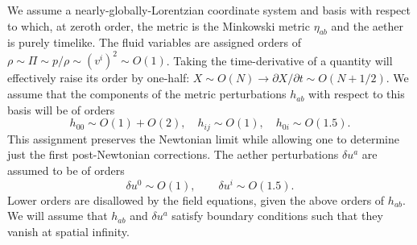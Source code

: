 \documentclass[aps,prd,preprint,amsmath,amssymb]{revtex4}
\def\beq{\begin{equation}}
\def\eeq{\end{equation}}
\begin{document}
We assume a nearly-globally-Lorentzian coordinate system and basis
with respect to which, at zeroth order, the metric is the
Minkowski metric $\eta_{ab}$ and the aether is purely
timelike. The fluid variables are assigned orders of $\rho \sim
\Pi\sim p/\rho\sim (v^i)^2\sim O(1)$. Taking the time-derivative
of a quantity will effectively raise its order by one-half:
$X \sim O(N) \rightarrow \partial X/\partial t \sim O(N+1/2)$. 
We assume
that the components of the metric perturbations 
$h_{ab}$ with respect to this basis will
be of orders
%
\beq
    h_{00} \sim O(1) + O(2),\quad h_{ij} \sim O(1),\quad h_{0i} \sim
    O(1.5).
\eeq
%
This assignment preserves the Newtonian limit while allowing one
to determine just the first post-Newtonian corrections. The
aether perturbations $\delta u^a$ are assumed to be of orders
%
\beq
    \delta u^0 \sim O(1),\qquad \delta u^i \sim O(1.5).
\eeq
%
Lower orders are disallowed by the field equations, given the
above orders of $h_{ab}$.  We will assume that $h_{ab}$
and $\delta u^a$ satisfy boundary conditions such that they vanish at
spatial infinity.
\end{document}
